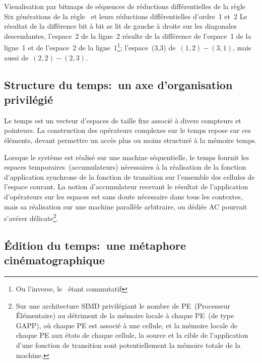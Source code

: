 %
{Visualisation par bitmaps de s\'equences de r\'eductions dif\-f\'erentiel\-les
  de la r\`egle~}%
{Six g\'en\'erations de la r\`egle~ et leurs r\'eductions dif\-f\'e\-ren\-tiel\-les
  d'ordre~1 et~2}%
{Le r\'esultat de la diff\'erence bit \`a bit se lit de gauche \`a droite sur
  les diagonales descendantes, l'espace~2 de la ligne~2 r\'esulte de la
  diff\'erence de l'espace~1 de la ligne~1 et de l'espace~2 de la
  ligne~1\footnote{%
    Ou l'inverse, le \xor\ \'etant commutatif};
  l'espace~(3,3) de~$(1,2)-(3,1)$, mais aussi de~$(2,2)-(2,3)$.}

\subsection{Structure du temps:~un axe d'organisation privil\'egi\'e}

Le temps est un vecteur d'espaces de taille fixe associ\'e \`a divers
compteurs et pointeurs. %
La construction des op\'erateurs complexes sur le temps repose sur ces
\'el\'ements, devant permettre un acc\`es plus ou moins structur\'e \`a la
m\'emoire temps. %

Lorsque le syst\`eme est r\'ealis\'e sur une machine s\'equentielle, le temps
fournit les espaces temporaires~(accumulateurs) n\'ecessaires \`a la
r\'ealisation de la fonction d'application synchrone de la fonction de
transition sur l'ensemble des cellules de l'espace courant. %
La notion d'accumulateur recevant le r\'esultat de l'application
d'op\'erateurs sur les espaces est sans doute n\'ecessaire dans tous les
contextes, mais sa r\'ealisation sur une machine parall\`ele arbitraire,
ou d\'edi\'ee AC pourrait s'av\'erer d\'elicate\footnote{%
  Sur une architecture SIMD privil\'egiant le nombre de PE~(Processeur
  \'El\'ementaire) au d\'etriment de la m\'emoire locale \`a chaque PE~(de type
  GAPP), o\`u chaque PE est associ\'e \`a une cellule, et la m\'emoire locale
  de chaque PE aux \'etats de chaque cellule, la source et la cible de
  l'application d'une fonction de transition sont potentiellement la
  m\'emoire totale de la machine.}. %

\subsection{\'Edition du temps:~une m\'etaphore cin\'ematogra\-phique}

